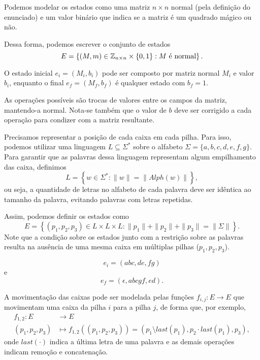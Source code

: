 \documentclass[a4paper]{report}
\begin{document}


Podemos modelar os estados como uma matriz $n\times n$ normal (pela definição do enunciado) e um valor binário que indica se a matriz é um quadrado mágico ou não.

Dessa forma, podemos escrever o conjunto de estados \[
E = \left\{ \left( M, m \right) \in  \mathbb{Z}_{n\times n} \times \{0,1\} : M\text{ é normal} \right\} 
.\] 


O estado inicial $e_i=\left( M_i, b_i \right) $ pode ser composto por matriz normal $M_i$ e valor $b_i$, enquanto o final $e_f=\left( M_f,b_f \right) $ é qualquer estado com $b_f=1$.


As operações possíveis são trocas de valores entre os campos da matriz, mantendo-a normal. Nota-se também que o valor de $b$ deve ser corrigido a cada operação para condizer com a matriz resultante.



Precisamos representar a posição de cada caixa em cada pilha. Para isso, podemos utilizar uma linguagem $L\subseteq \Sigma^*$ sobre o alfabeto $\Sigma=\{a,b,c,d,e,f,g\} $. Para garantir que as palavras dessa linguagem representam algum empilhamento das caixa, definimos \[
L = \left\{ w\in \Sigma^* : \|w\| = \|Alph\left( w \right) \|\right\} 
,\] ou seja, a quantidade de letras no alfabeto de cada palavra deve ser idêntica ao tamanho da palavra, evitando palavras com letras repetidas.

Assim, podemos definir os estados como \[
E = \left\{ \left( p_1,p_2,p_3 \right) \in L\times L\times L : \|p_1\|+\|p_2\|+\|p_3\| = \|\Sigma\| \right\} 
.\] Note que a condição sobre os estados junto com a restrição sobre as palavras resulta na ausência de uma mesma caixa em múltiplas pilhas ($p_1,p_2,p_3$).


\[
e_i = \left( abc, de, fg \right) 
\] e \[
e_f = \left( \epsilon, abcgf, ed \right) 
.\] 


A movimentação das caixas pode ser modelada pelas funções $f_{i,j}: E \longrightarrow E$ que movimentam uma caixa da pilha $i$ para a pilha $j$, de forma que, por exemplo,
\begin{align*}
    f_{1,2}: E &\longrightarrow E \\
    \left( p_1,p_2,p_3 \right)  &\longmapsto f_{1,2}(\left( p_1,p_2,p_3 \right) ) = \left( p_1 \setminus last\left( p_1 \right), p_2\cdot last\left( p_1 \right)  , p_3 \right) 
,\end{align*}
onde $last(\cdot )$ indica a última letra de uma palavra e as demais operações indicam remoção e concatenação.
\end{document}
